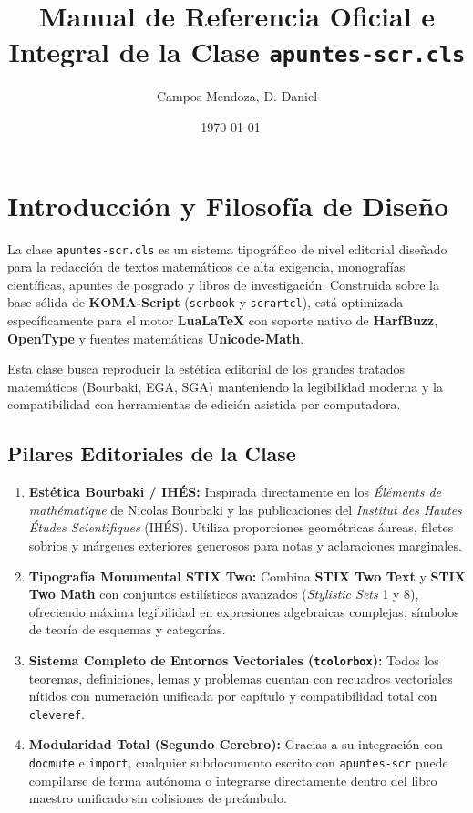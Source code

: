 \documentclass[11pt,book,spanish,alphabetic]{apuntes-scr}
\title[Guía Definitiva de Arquitectura Tipográfica, Estructura Bourbaki / IHÉS y Redacción Científica]{Manual de Referencia Oficial e Integral de la Clase \texttt{apuntes-scr.cls}}
\author{Campos Mendoza, D. Daniel}
\date{\today\ \textperiodcentered\ \DTMcurrenttime}
\begin{document}
\frontmatter
\maketitle
\tableofcontents

\mainmatter

\chapter{Introducción y Filosofía de Diseño}

La clase \texttt{apuntes-scr.cls} es un sistema tipográfico de nivel editorial diseñado para la redacción de textos matemáticos de alta exigencia, monografías científicas, apuntes de posgrado y libros de investigación. Construida sobre la base sólida de \textbf{KOMA-Script} (\texttt{scrbook} y \texttt{scrartcl}), está optimizada específicamente para el motor \textbf{Lua\LaTeX} con soporte nativo de \textbf{HarfBuzz}, \textbf{OpenType} y fuentes matemáticas \textbf{Unicode-Math}.

\begin{notabox}
  Esta clase busca reproducir la estética editorial de los grandes tratados matemáticos (Bourbaki, EGA, SGA) manteniendo la legibilidad moderna y la compatibilidad con herramientas de edición asistida por computadora.
\end{notabox}

\section{Pilares Editoriales de la Clase}
\begin{enumerate}[label=\bfseries\arabic*., leftmargin=10mm]
    \item \textbf{Estética Bourbaki / IHÉS:} Inspirada directamente en los \textit{Éléments de mathématique} de Nicolas Bourbaki y las publicaciones del \textit{Institut des Hautes Études Scientifiques} (IHÉS). Utiliza proporciones geométricas áureas, filetes sobrios y márgenes exteriores generosos para notas y aclaraciones marginales.
    \item \textbf{Tipografía Monumental STIX Two:} Combina \textbf{STIX Two Text} y \textbf{STIX Two Math} con conjuntos estilísticos avanzados (\textit{Stylistic Sets} 1 y 8), ofreciendo máxima legibilidad en expresiones algebraicas complejas, símbolos de teoría de esquemas y categorías.
    \item \textbf{Sistema Completo de Entornos Vectoriales (\texttt{tcolorbox}):} Todos los teoremas, definiciones, lemas y problemas cuentan con recuadros vectoriales nítidos con numeración unificada por capítulo y compatibilidad total con \texttt{cleveref}.
    \item \textbf{Modularidad Total (Segundo Cerebro):} Gracias a su integración con \texttt{docmute} e \texttt{import}, cualquier subdocumento escrito con \texttt{apuntes-scr} puede compilarse de forma autónoma o integrarse directamente dentro del libro maestro unificado sin colisiones de preámbulo.
\end{enumerate}
\end{document}
